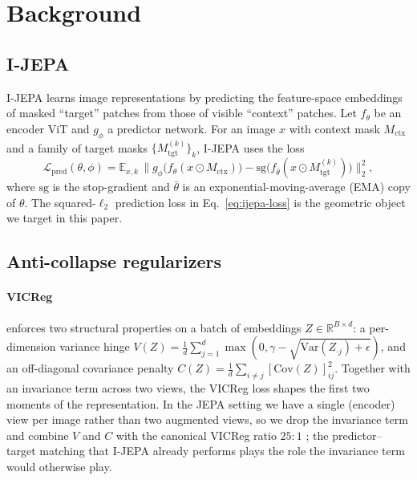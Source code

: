 \documentclass{article}
\begin{document}
\section{Background}
\label{sec:background}

\subsection{I-JEPA}
I-JEPA \citep{assran2023ijepa} learns image representations by predicting the feature-space embeddings of masked ``target'' patches from those of visible ``context'' patches. Let $f_\theta$ be an encoder ViT and $g_\phi$ a predictor network. For an image $x$ with context mask $M_{\text{ctx}}$ and a family of target masks $\{M^{(k)}_{\text{tgt}}\}_k$, I-JEPA uses the loss
\begin{equation}
  \mathcal{L}_{\text{pred}}(\theta,\phi) = \mathbb{E}_{x,k}\, \bigl\| g_\phi\bigl(f_\theta(x \odot M_{\text{ctx}})\bigr) - \mathrm{sg}\bigl(f_{\bar\theta}(x \odot M^{(k)}_{\text{tgt}})\bigr) \bigr\|_2^2,
  \label{eq:ijepa-loss}
\end{equation}
where $\mathrm{sg}$ is the stop-gradient and $\bar\theta$ is an exponential-moving-average (EMA) copy of $\theta$. The squared-$\ell_2$ prediction loss in Eq.~\ref{eq:ijepa-loss} is the geometric object we target in this paper.

\subsection{Anti-collapse regularizers}
\label{sec:background:regs}

\paragraph{VICReg \citep{bardes2022vicreg}} enforces two structural properties on a batch of embeddings $Z \in \mathbb{R}^{B\times d}$: a per-dimension variance hinge $V(Z) = \frac{1}{d}\sum_{j=1}^d \max(0, \gamma - \sqrt{\mathrm{Var}(Z_{\cdot j}) + \epsilon})$, and an off-diagonal covariance penalty $C(Z) = \frac{1}{d}\sum_{i\neq j} [\mathrm{Cov}(Z)]_{ij}^2$. Together with an invariance term across two views, the VICReg loss shapes the first two moments of the representation. In the JEPA setting we have a single (encoder) view per image rather than two augmented views, so we drop the invariance term and combine $V$ and $C$ with the canonical VICReg ratio $25{:}1$ \citep{bardes2022vicreg}; the predictor--target matching that I-JEPA already performs plays the role the invariance term would otherwise play.
\end{document}
